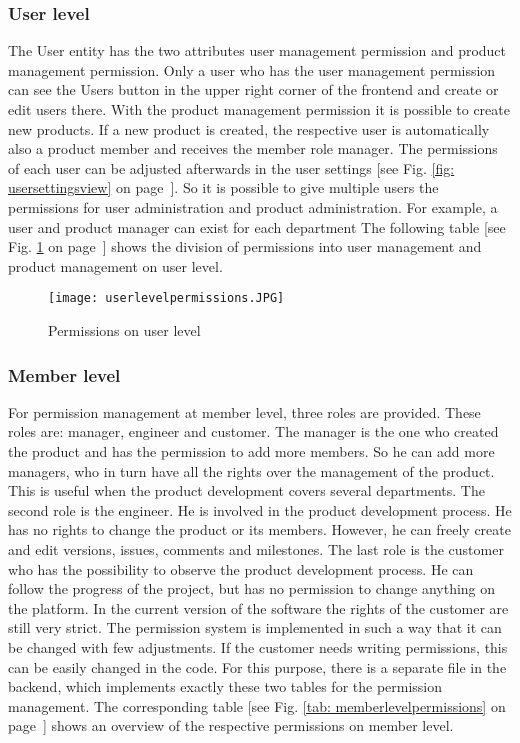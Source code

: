     \subsubsection*{User level}
    The User entity has the two attributes user management permission and product management permission. Only a user who has the user management permission can see the Users button in the upper right corner of the frontend and create or edit users there. With the product management permission it is possible to create new products. If a new product is created, the respective user is automatically also a product member and receives the member role manager. The permissions of each user can be adjusted afterwards in the user settings [see Fig. \ref{fig: usersettingsview} on page~\pageref{fig: usersettingsview}]. So it is possible to give multiple users the permissions for user administration and product administration. For example, a user and product manager can exist for each department The following table [see Fig. \ref{tab: userlevelpermissions} on page~\pageref{tab: userlevelpermissions}] shows the division of permissions into user management and product management on user level.

    \begin{figure}[h]
        \centering
        \texttt{[image: userlevelpermissions.JPG]}
        \caption{Permissions on user level}
        \label{tab: userlevelpermissions}
    \end{figure}

    \subsubsection*{Member level}
    For permission management at member level, three roles are provided. These roles are: manager, engineer and customer. The manager is the one who created the product and has the permission to add more members. So he can add more managers, who in turn have all the rights over the management of the product. This is useful when the product development covers several departments. The second role is the engineer. He is involved in the product development process. He has no rights to change the product or its members. However, he can freely create and edit versions, issues, comments and milestones. The last role is the customer who has the possibility to observe the product development process. He can follow the progress of the project, but has no permission to change anything on the platform. In the current version of the software the rights of the customer are still very strict. The permission system is implemented in such a way that it can be changed with few adjustments. If the customer needs writing permissions, this can be easily changed in the code. For this purpose, there is a separate file in the backend, which implements exactly these two tables for the permission management. The corresponding table [see Fig. \ref{tab: memberlevelpermissions} on page~\pageref{tab: memberlevelpermissions}]  shows an overview of the respective permissions on member level.

